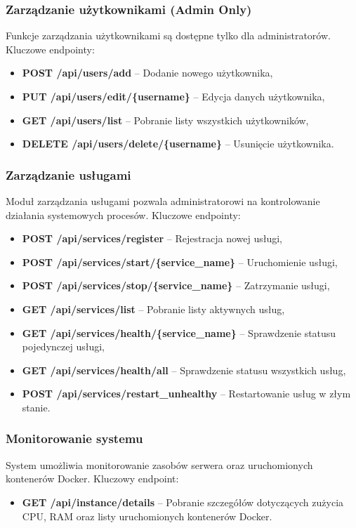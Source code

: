 \subsubsection{Zarządzanie użytkownikami (Admin Only)}
Funkcje zarządzania użytkownikami są dostępne tylko dla administratorów. Kluczowe endpointy:
\begin{itemize}
    \item \textbf{POST /api/users/add} – Dodanie nowego użytkownika,
    \item \textbf{PUT /api/users/edit/\{username\}} – Edycja danych użytkownika,
    \item \textbf{GET /api/users/list} – Pobranie listy wszystkich użytkowników,
    \item \textbf{DELETE /api/users/delete/\{username\}} – Usunięcie użytkownika.
\end{itemize}

\subsubsection{Zarządzanie usługami}
Moduł zarządzania usługami pozwala administratorowi na kontrolowanie działania systemowych procesów. Kluczowe endpointy:
\begin{itemize}
    \item \textbf{POST /api/services/register} – Rejestracja nowej usługi,
    \item \textbf{POST /api/services/start/\{service\_name\}} – Uruchomienie usługi,
    \item \textbf{POST /api/services/stop/\{service\_name\}} – Zatrzymanie usługi,
    \item \textbf{GET /api/services/list} – Pobranie listy aktywnych usług,
    \item \textbf{GET /api/services/health/\{service\_name\}} – Sprawdzenie statusu pojedynczej usługi,
    \item \textbf{GET /api/services/health/all} – Sprawdzenie statusu wszystkich usług,
    \item \textbf{POST /api/services/restart\_unhealthy} – Restartowanie usług w złym stanie.
\end{itemize}

\subsubsection{Monitorowanie systemu}
System umożliwia monitorowanie zasobów serwera oraz uruchomionych kontenerów Docker. Kluczowy endpoint:
\begin{itemize}
    \item \textbf{GET /api/instance/details} – Pobranie szczegółów dotyczących zużycia CPU, RAM oraz listy uruchomionych kontenerów Docker.
\end{itemize}

